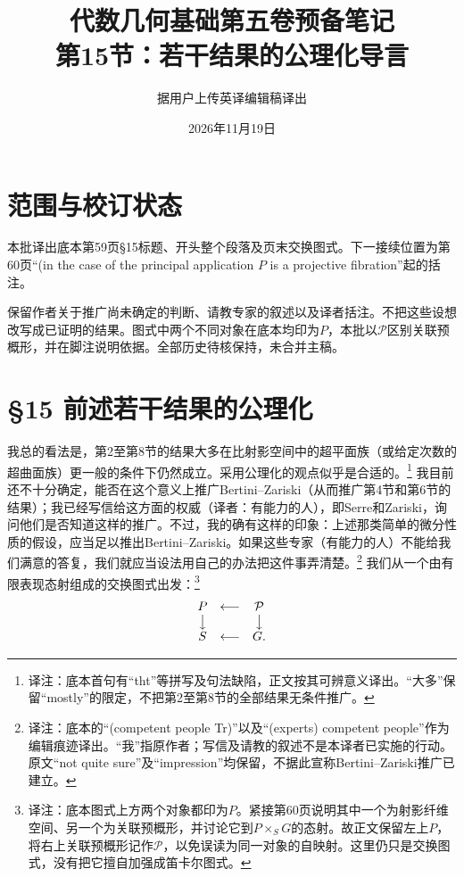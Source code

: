 \documentclass[openany,fontset=fandol]{ctexbook}
\newcommand{\note}[1]{\unskip\nobreak\footnote{译注：#1}}
\begin{document}
\title{代数几何基础第五卷预备笔记\\第15节：若干结果的公理化导言}
\author{据用户上传英译编辑稿译出}
\date{2026年11月19日}
\maketitle
\chapter*{范围与校订状态}
本批译出底本第59页§15标题、开头整个段落及页末交换图式。下一接续位置为第60页“(in the case of the principal application $P$ is a projective fibration”起的括注。

保留作者关于推广尚未确定的判断、请教专家的叙述以及译者括注。不把这些设想改写成已证明的结果。图式中两个不同对象在底本均印为$P$，本批以$\mathcal P$区别关联预概形，并在脚注说明依据。全部历史待核保持，未合并主稿。
\chapter*{§15 前述若干结果的公理化}
我总的看法是，第2至第8节的结果大多在比射影空间中的超平面族（或给定次数的超曲面族）更一般的条件下仍然成立。采用公理化的观点似乎是合适的。\note{底本首句有“tht”等拼写及句法缺陷，正文按其可辨意义译出。“大多”保留“mostly”的限定，不把第2至第8节的全部结果无条件推广。}
我目前还不十分确定，能否在这个意义上推广Bertini--Zariski（从而推广第4节和第6节的结果）；我已经写信给这方面的权威（译者：有能力的人），即Serre和Zariski，询问他们是否知道这样的推广。不过，我的确有这样的印象：上述那类简单的微分性质的假设，应当足以推出Bertini--Zariski。如果这些专家（有能力的人）不能给我们满意的答复，我们就应当设法用自己的办法把这件事弄清楚。\note{底本的“(competent people Tr)”以及“(experts) competent people”作为编辑痕迹译出。“我”指原作者；写信及请教的叙述不是本译者已实施的行动。原文“not quite sure”及“impression”均保留，不据此宣称Bertini--Zariski推广已建立。}
我们从一个由有限表现态射组成的交换图式出发：\note{底本图式上方两个对象都印为$P$。紧接第60页说明其中一个为射影纤维空间、另一个为关联预概形，并讨论它到$P\times_S G$的态射。故正文保留左上$P$，将右上关联预概形记作$\mathcal P$，以免误读为同一对象的自映射。这里仍只是交换图式，没有把它擅自加强成笛卡尔图式。}
\[
\begin{array}{ccc}
P&\longleftarrow&\mathcal P\\
\big\downarrow&&\big\downarrow\\
S&\longleftarrow&G.
\end{array}
\]
\end{document}

